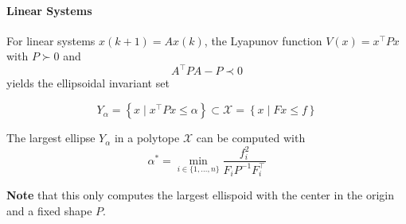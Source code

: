 \paragraph{Linear Systems}
For linear systems $x(k+1)=Ax(k)$, the Lyapunov function $V(x)=x^\top Px$ with $P\succ 0$  and
\begin{equation*}
    A^\top PA-P \prec 0
\end{equation*}
yields the ellipsoidal invariant set

\begin{equation*}
    Y_\alpha = \left\{x\mid x^\top Px\leq \alpha\right\} \subset \mathcal{X}= \left\{x\mid Fx\leq f\right\}
\end{equation*}

\newpar{}

The largest ellipse $Y_\alpha$ in a polytope $\mathcal{X}$ can be computed with
\begin{equation*}
    \alpha^* = \min_{i\in \{1,\ldots, n\}} \frac{f_i^2}{F_i P^{-1} F_i^\top}
\end{equation*}

\textbf{Note} that this only computes the largest ellispoid with the center in the origin and a fixed shape $P$.